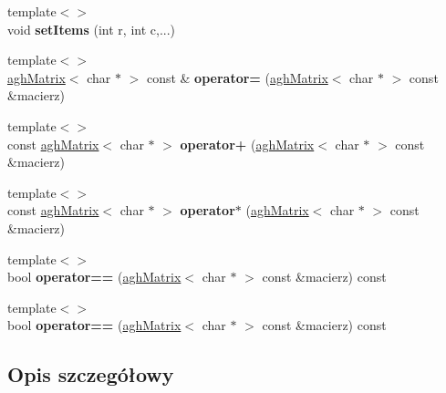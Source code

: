 \begin{DoxyCompactItemize}
\item 
\hypertarget{classaghMatrix_a1677a3cff6e87d8b12dedb2cb1c4396c}{{\footnotesize template$<$$>$ }\\void {\bfseries set\-Items} (int r, int c,...)}\label{classaghMatrix_a1677a3cff6e87d8b12dedb2cb1c4396c}

\item 
\hypertarget{classaghMatrix_ab663b12fd56cf4aa499cd67434f0e6ec}{{\footnotesize template$<$$>$ }\\\hyperlink{classaghMatrix}{agh\-Matrix}$<$ char $\ast$ $>$ const \& {\bfseries operator=} (\hyperlink{classaghMatrix}{agh\-Matrix}$<$ char $\ast$ $>$ const \&macierz)}\label{classaghMatrix_ab663b12fd56cf4aa499cd67434f0e6ec}

\item 
\hypertarget{classaghMatrix_a01da87c9cb582f63ef9a54b180df7e7d}{{\footnotesize template$<$$>$ }\\const \hyperlink{classaghMatrix}{agh\-Matrix}$<$ char $\ast$ $>$ {\bfseries operator+} (\hyperlink{classaghMatrix}{agh\-Matrix}$<$ char $\ast$ $>$ const \&macierz)}\label{classaghMatrix_a01da87c9cb582f63ef9a54b180df7e7d}

\item 
\hypertarget{classaghMatrix_a625cd50cf56264c33ef7f9161cccb5f9}{{\footnotesize template$<$$>$ }\\const \hyperlink{classaghMatrix}{agh\-Matrix}$<$ char $\ast$ $>$ {\bfseries operator$\ast$} (\hyperlink{classaghMatrix}{agh\-Matrix}$<$ char $\ast$ $>$ const \&macierz)}\label{classaghMatrix_a625cd50cf56264c33ef7f9161cccb5f9}

\item 
\hypertarget{classaghMatrix_a09574b9a3132442f8a837d0718e2e933}{{\footnotesize template$<$$>$ }\\bool {\bfseries operator==} (\hyperlink{classaghMatrix}{agh\-Matrix}$<$ char $\ast$ $>$ const \&macierz) const}\label{classaghMatrix_a09574b9a3132442f8a837d0718e2e933}

\item 
\hypertarget{classaghMatrix_a09574b9a3132442f8a837d0718e2e933}{{\footnotesize template$<$$>$ }\\bool {\bfseries operator==} (\hyperlink{classaghMatrix}{agh\-Matrix}$<$ char $\ast$ $>$ const \&macierz) const}\label{classaghMatrix_a09574b9a3132442f8a837d0718e2e933}

\end{DoxyCompactItemize}


\subsection{Opis szczegółowy}
